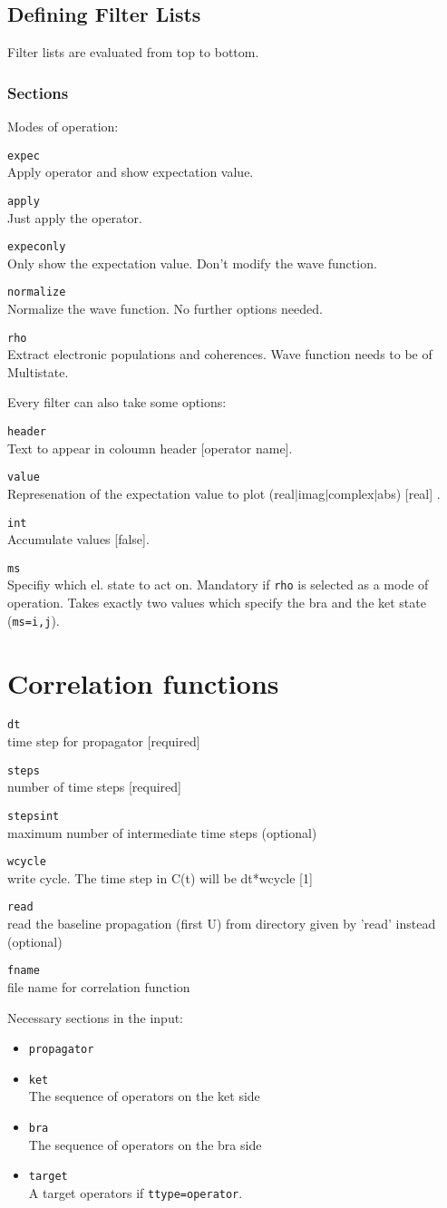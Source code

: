 \documentclass[a4paper,12pt]{scrbook}
\newcommand{\option}[2]{\item \texttt{#1}\\ #2}
\newcommand{\code}[1]{\texttt{#1}}
\begin{document}
\subsection{Defining Filter Lists}
\label{sec:Filters}
Filter lists are evaluated from top to bottom.

\subsubsection*{Sections}
Modes of operation:
\begin{options}
\option{expec}{Apply operator and show expectation value.}
\option{apply}{Just apply the operator.}
\option{expeconly}{Only show the expectation value. Don't modify the wave function.}
\option{normalize}{Normalize the wave function. No further options needed.}
\option{rho}{Extract electronic populations and coherences. Wave function needs to be of Multistate.}
\end{options}

Every filter can also take some options:
\begin{options}
\option{header}{Text to appear in coloumn header [operator name].}
\option{value}{Represenation of the expectation value to plot (real$|$imag$|$complex$|$abs) [real] .}
\option{int}{Accumulate values [false].}
\option{ms}{Specifiy which el. state to act on. Mandatory if \code{rho} is selected as a 
mode of operation. Takes exactly two values which specify the bra and the ket state (\code{ms=i,j}).}
\end{options}


\section{Correlation functions}
\begin{options}
\option{dt}{time step for propagator [required]}
\option{steps}{number of time steps [required]}
\option{stepsint}{ maximum number of intermediate time steps (optional)}
\option{wcycle}{write cycle. The time step in C(t) will be dt*wcycle [1]}
\option{read}{read the baseline propagation (first U) from directory given by 'read' instead (optional)}
\option{fname}{file name for correlation function}
\end{options}

Necessary sections in the input:
\begin{itemize}
 \option{propagator}{}
 \option{ket}{The sequence of operators on the ket side}
 \option{bra}{The sequence of operators on the bra side}
 \option{target}{A target operators if \code{ttype=operator}.}
\end{itemize}
\end{document}
